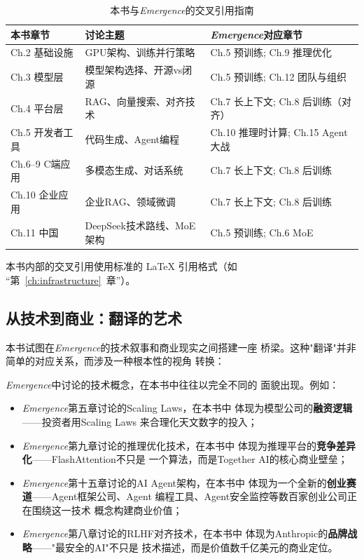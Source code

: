 \begin{table}[htbp]
\centering
\caption{本书与\textit{Emergence}的交叉引用指南}
\label{tab:cross-reference}
\small
\begin{tabularx}{\textwidth}{l X X}
\toprule
\rowcolor{figLightGray}
\textbf{本书章节} & \textbf{讨论主题}
  & \textbf{\textit{Emergence}对应章节} \\
\midrule
Ch.2 基础设施
  & GPU架构、训练并行策略
  & Ch.5 预训练; Ch.9 推理优化 \\
\rowcolor{figLightGray}
Ch.3 模型层
  & 模型架构选择、开源vs闭源
  & Ch.5 预训练; Ch.12 团队与组织 \\
Ch.4 平台层
  & RAG、向量搜索、对齐技术
  & Ch.7 长上下文; Ch.8 后训练（对齐） \\
\rowcolor{figLightGray}
Ch.5 开发者工具
  & 代码生成、Agent编程
  & Ch.10 推理时计算; Ch.15 Agent大战 \\
Ch.6--9 C端应用
  & 多模态生成、对话系统
  & Ch.7 长上下文; Ch.8 后训练 \\
\rowcolor{figLightGray}
Ch.10 企业应用
  & 企业RAG、领域微调
  & Ch.7 长上下文; Ch.8 后训练 \\
Ch.11 中国
  & DeepSeek技术路线、MoE架构
  & Ch.5 预训练; Ch.6 MoE \\
\bottomrule
\end{tabularx}
\end{table}

本书内部的交叉引用使用标准的 \LaTeX{} 引用格式（如
``第~\ref{ch:infrastructure}~章''）。

\subsection{从技术到商业：翻译的艺术}

本书试图在\textit{Emergence}的技术叙事和商业现实之间搭建一座
桥梁。这种"翻译"并非简单的对应关系，而涉及一种根本性的视角
转换：

\textit{Emergence}中讨论的技术概念，在本书中往往以完全不同的
面貌出现。例如：
\begin{itemize}
  \item \textit{Emergence}第五章讨论的Scaling Laws，在本书中
    体现为模型公司的\textbf{融资逻辑}——投资者用Scaling Laws
    来合理化天文数字的投入；
  \item \textit{Emergence}第九章讨论的推理优化技术，在本书中
    体现为推理平台的\textbf{竞争差异化}——FlashAttention不只是
    一个算法，而是Together AI的核心商业壁垒；
  \item \textit{Emergence}第十五章讨论的AI Agent架构，在本书中
    体现为一个全新的\textbf{创业赛道}——Agent框架公司、Agent
    编程工具、Agent安全监控等数百家创业公司正在围绕这一技术
    概念构建商业价值；
  \item \textit{Emergence}第八章讨论的RLHF对齐技术，在本书中
    体现为Anthropic的\textbf{品牌战略}——"最安全的AI"不只是
    技术描述，而是价值数千亿美元的商业定位。
\end{itemize}


